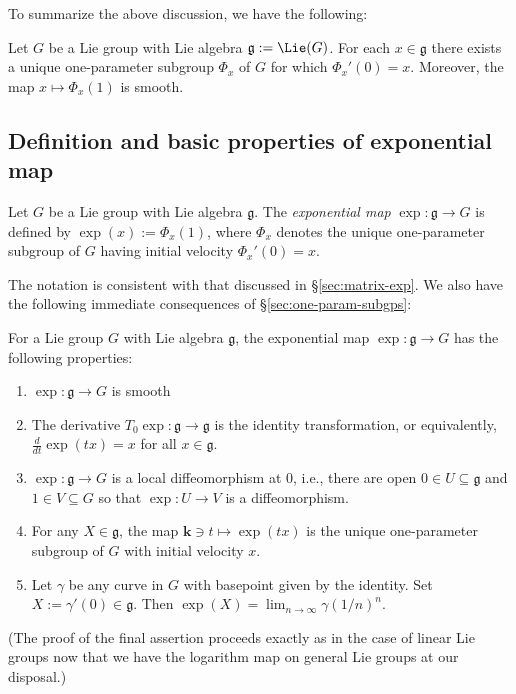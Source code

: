 \documentclass[reqno]{amsart} 
\begin{document}
To summarize the above discussion, we have the following:
\begin{theorem}\label{thm:classification-smooth-1-param-subgroups}
  Let $G$ be a Lie group with Lie algebra
  $\mathfrak{g} := \Lie(G)$.
  For each $x \in \mathfrak{g}$ there exists a unique one-parameter
  subgroup $\Phi_x$ of $G$ for which $\Phi_x'(0) = x$.
  Moreover,
  the map $x \mapsto \Phi_x(1)$ is smooth.
\end{theorem}

\subsection{Definition and basic properties of exponential map}
\label{sec:org1d85865}
\begin{definition}
  Let $G$ be a Lie group
  with Lie algebra $\mathfrak{g}$.
  The \emph{exponential map}
  $\exp : \mathfrak{g} \rightarrow G$
  is defined by $\exp(x) := \Phi_x(1)$,
  where $\Phi_x$ denotes the unique one-parameter
  subgroup of $G$ having initial velocity $\Phi_x'(0) = x$.
\end{definition}
The notation is consistent with that discussed in
\S\ref{sec:matrix-exp}.
We also have the following immediate consequences of \S\ref{sec:one-param-subgps}:
\begin{theorem}\label{thm:exp-local-diffeo}
  For a Lie group $G$ with Lie algebra $\mathfrak{g}$,
  the exponential map $\exp : \mathfrak{g} \rightarrow G$
  has the following properties:
  \begin{enumerate}
  \item $\exp : \mathfrak{g} \rightarrow G$ is smooth
  \item The derivative
    $T_0 \exp : \mathfrak{g} \rightarrow \mathfrak{g}$
    is the identity transformation,
    or equivalently,
    $\frac{d}{d t} \exp(t x) = x$ for all $x \in \mathfrak{g}$.
  \item $\exp : \mathfrak{g} \rightarrow G$
    is a local diffeomorphism at $0$,
    i.e.,
    there are open $0 \in U \subseteq \mathfrak{g}$
    and $1 \in V \subseteq G$
    so that $\exp : U \rightarrow V$
    is a diffeomorphism.
  \item For any $X \in \mathfrak{g}$, the map
    $\mathbf{k} \ni t \mapsto \exp(t x)$ is the unique
    one-parameter subgroup of $G$ with initial velocity $x$.
  \item
    Let $\gamma$ be any curve in $G$ with basepoint given by the
    identity.
    Set $X := \gamma '(0) \in \mathfrak{g}$.
    Then
    $\exp(X) = \lim_{n \rightarrow \infty} \gamma(1/n)^n$.
  \end{enumerate}
\end{theorem}
(The proof of the final assertion proceeds
exactly as in the case of linear Lie groups
now that we have the logarithm map on general Lie groups at our
disposal.)
\end{document}
